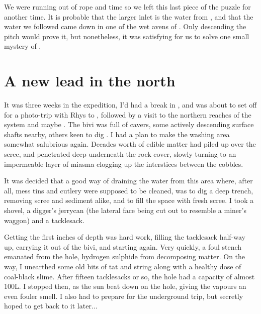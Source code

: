 

    We were running out of rope and time so we left this last piece of the puzzle for another time. It is probable that the larger inlet is the water from , and that the water we followed came down in one of the wet avens of . Only descending the pitch would prove it, but nonetheless, it was satisfying for us to solve one small mystery of . 
    
    \section{A new lead in the north}
It was three weeks in the expedition, I'd had a break in , and was about to set off for a photo-trip with Rhys to , followed by a visit to the northern reaches of the system and maybe . The bivi was full of cavers, some actively descending surface shafts nearby, others keen to dig . I had a plan to make the washing area somewhat salubrious again. Decades worth of edible matter had piled up over the scree, and penetrated deep underneath the rock cover, slowly turning to an impermeable layer of miasma clogging up the interstices between the cobbles.

It was decided that a good way of draining the water from this area where, after all, mess tins and cutlery were supposed to be cleaned, was to dig a deep trench, removing scree and sediment alike, and to fill the space with fresh scree. I took a shovel, a digger's jerrycan (the lateral face being cut out to resemble a miner's waggon) and a tacklesack. 

Getting the first inches of depth was hard work, filling the tacklesack half-way up, carrying it out of the bivi, and starting again. Very quickly, a foul stench emanated from the hole, hydrogen sulphide from decomposing matter. On the way, I unearthed some old bits of tat and string along with a healthy dose of coal-black slime. After fifteen tacklesacks or so, the hole had a capacity of almost 100L. I stopped then, as the sun beat down on the hole, giving the vapours an even fouler smell. I also had to prepare for the underground trip, but secretly hoped to get back to it later...

